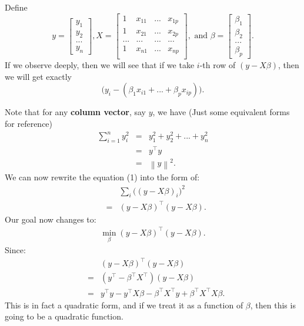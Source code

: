 \documentclass{article}
\theoremstyle{MyNonumberplain}
\theoremstyle{break}
\newcommand{\bt}[1]{\beta_{#1}}
\theoremstyle{break}
\theoremstyle{break}
\theoremstyle{break}
\begin{document}
\begin{thmbox}
    \begin{prfbox}
        Define 
        $$y=
            \begin{bmatrix}
                y_1 \\
                y_2 \\
                ... \\
                y_n 
            \end{bmatrix}
            , X=
            \begin{bmatrix}
                1 & x_{11} &...& x_{1p}\\
                1 & x_{21} &...& x_{2p}\\
                ...&...&...&...\\
                1 & x_{n1} &...& x_{np}\\
            \end{bmatrix} 
            , \text{ and } \beta=
            \begin{bmatrix}
                \beta_1 \\
                \beta_2 \\
                ... \\
                \beta_p
            \end{bmatrix}.$$
    If we observe deeply, then we will see that if we take $i$-th row of $(y-X\beta)$, then we will get exactly $$\bigl(y_i-(\bt{1}x_{i1}+...+\bt{p}x_{ip})\bigr).$$

    Note that for any \textbf{column vector}, say $y$, we have (Just some equivalent forms for reference)
    \begin{eqnarray*}
        \sum_{i=1}^n y_i^2 &=& y_1^2+y_2^2+...+y_n^2 \\
                           &=& y^\intercal y\\
                           &=& \left\lVert y\right\rVert^2.
    \end{eqnarray*}
    We can now rewrite the equation (1) into the form of:
    \begin{eqnarray*}
        & & \sum_i \bigl((y-X\beta)_i\bigr)^2\\
        &=& (y-X\beta)^\intercal (y-X\beta).
    \end{eqnarray*}
    Our goal now changes to:
    \begin{eqnarray}
        \min_\beta (y-X\beta)^\intercal (y-X\beta).
    \end{eqnarray}
    Since:
    \begin{eqnarray*}
        & &(y-X\beta)^\intercal (y-X\beta) \\
        &=&(y^\intercal-\beta^\intercal X^\intercal) (y-X\beta)\\
        &=&y^\intercal y - y^\intercal X\beta - \beta^\intercal X^\intercal y + \beta^\intercal X^\intercal X\beta.
    \end{eqnarray*}
    This is in fact a quadratic form, and if we treat it as a function of $\beta$, then this is going to be a quadratic function.


\end{prfbox}
\end{thmbox}
\end{document}
